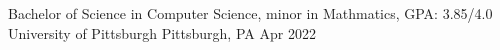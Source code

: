 
\begin{cventries}
    \cventry
    {Bachelor of Science in Computer Science, minor in Mathmatics, GPA: 3.85/4.0} %
    {University of Pittsburgh} %
    {Pittsburgh, PA} %
    {Apr 2022} %
    {}
\end{cventries}
